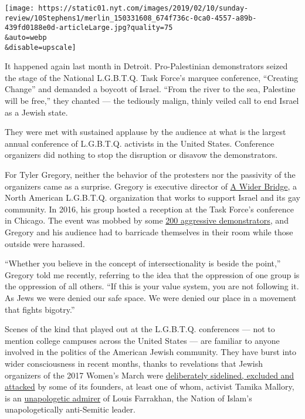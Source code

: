 \texttt{[image: https://static01.nyt.com/images/2019/02/10/sunday-review/10Stephens1/merlin\_150331608\_674f736c-0ca0-4557-a89b-439fd0188e0d-articleLarge.jpg?quality=75\\\&auto=webp\\\&disable=upscale]}

It happened again last month in Detroit. Pro-Palestinian demonstrators
seized the stage of the National L.G.B.T.Q. Task Force's marquee
conference, ``Creating Change'' and demanded a boycott of Israel. ``From
the river to the sea, Palestine will be free,'' they chanted --- the
tediously malign, thinly veiled call to end Israel as a Jewish state.

They were met with sustained applause by the audience at what is the
largest annual conference of L.G.B.T.Q. activists in the United States.
Conference organizers did nothing to stop the disruption or disavow the
demonstrators.

For Tyler Gregory, neither the behavior of the protesters nor the
passivity of the organizers came as a surprise. Gregory is executive
director of \href{https://awiderbridge.org/}{A Wider Bridge}, a North
American L.G.B.T.Q. organization that works to support Israel and its
gay community. In 2016, his group hosted a reception at the Task Force's
conference in Chicago. The event was mobbed by some
\href{https://www.youtube.com/watch?v=Rz4KkvvjBB8\&feature=youtu.be}{200
aggressive demonstrators}, and Gregory and his audience had to barricade
themselves in their room while those outside were harassed.

``Whether you believe in the concept of intersectionality is beside the
point,'' Gregory told me recently, referring to the idea that the
oppression of one group is the oppression of all others. ``If this is
your value system, you are not following it. As Jews we were denied our
safe space. We were denied our place in a movement that fights
bigotry.''

Scenes of the kind that played out at the L.G.B.T.Q. conferences --- not
to mention college campuses across the United States --- are familiar to
anyone involved in the politics of the American Jewish community. They
have burst into wider consciousness in recent months, thanks to
revelations that Jewish organizers of the 2017 Women's March were
\href{https://www.tabletmag.com/jewish-news-and-politics/276694/is-the-womens-march-melting-down}{deliberately
sidelined, excluded and attacked} by some of its founders, at least one
of whom, activist Tamika Mallory, is an
\href{https://www.nationalreview.com/news/tamika-mallory-defends-decision-to-praise-farrakhan-as-the-greatest-of-all-time/}{unapologetic
admirer} of Louis Farrakhan, the Nation of Islam's unapologetically
anti-Semitic leader.

